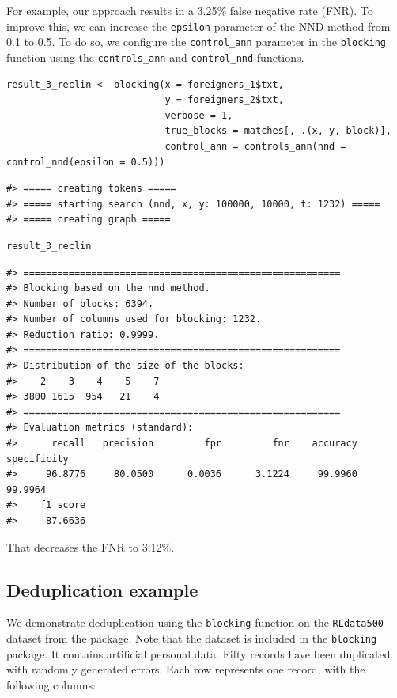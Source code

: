 For example, our approach results in a 3.25\% false negative rate (FNR). To improve this, we can increase the \texttt{epsilon} parameter of the NND method from 0.1 to 0.5. To do so, we configure the \texttt{control\_ann} parameter in the \texttt{blocking} function using the \texttt{controls\_ann} and \texttt{control\_nnd} functions.

\begin{verbatim}
result_3_reclin <- blocking(x = foreigners_1$txt,
                            y = foreigners_2$txt,
                            verbose = 1,
                            true_blocks = matches[, .(x, y, block)],
                            control_ann = controls_ann(nnd = control_nnd(epsilon = 0.5)))
\end{verbatim}

\begin{verbatim}
#> ===== creating tokens =====
#> ===== starting search (nnd, x, y: 100000, 10000, t: 1232) =====
#> ===== creating graph =====
\end{verbatim}

\begin{verbatim}
result_3_reclin
\end{verbatim}

\begin{verbatim}
#> ========================================================
#> Blocking based on the nnd method.
#> Number of blocks: 6394.
#> Number of columns used for blocking: 1232.
#> Reduction ratio: 0.9999.
#> ========================================================
#> Distribution of the size of the blocks:
#>    2    3    4    5    7 
#> 3800 1615  954   21    4 
#> ========================================================
#> Evaluation metrics (standard):
#>      recall   precision         fpr         fnr    accuracy specificity 
#>     96.8776     80.0500      0.0036      3.1224     99.9960     99.9964 
#>    f1_score 
#>     87.6636
\end{verbatim}

That decreases the FNR to 3.12\%.

\subsection{Deduplication example}\label{deduplication-example}

We demonstrate deduplication using the \texttt{blocking} function on the \texttt{RLdata500} dataset from the  package. Note that the dataset is included in the \texttt{blocking} package. It contains artificial personal data. Fifty records have been duplicated with randomly generated errors. Each row represents one record, with the following columns:

